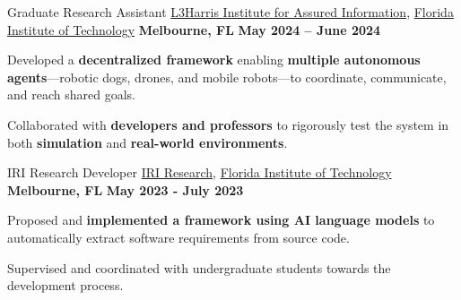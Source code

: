 \begin{cventries}
\cventry
{Graduate Research Assistant}
{\href{https://research.fit.edu/l3hiai/}{L3Harris Institute for Assured Information}, \href{https://www.fit.edu}{Florida Institute of Technology}}
{\textbf{Melbourne, FL}}
{\textbf{May 2024 – June 2024}}
{
\begin{cvitems}
\item Developed a \textbf{decentralized framework} enabling \textbf{multiple autonomous agents}—robotic dogs, drones, and mobile robots—to coordinate, communicate, and reach shared goals.
\item Collaborated with \textbf{developers and professors} to rigorously test the system in both \textbf{simulation} and \textbf{real-world environments}.
\end{cvitems}
}

\cventry
{IRI Research Developer}
{\href{https://www.fit.edu/faculty-profiles/s/slhoub-khaled-/}{IRI Research},  \href{https://www.fit.edu}{Florida Institute of Technology}}
{\textbf{Melbourne, FL}}
{\textbf{May 2023 - July 2023}}
{
\begin{cvitems}
\item Proposed and \textbf{implemented a framework using AI language models} to automatically extract software requirements from source code.
\item Supervised and coordinated with undergraduate students towards the development process.
\end{cvitems}
}

\end{cventries}
